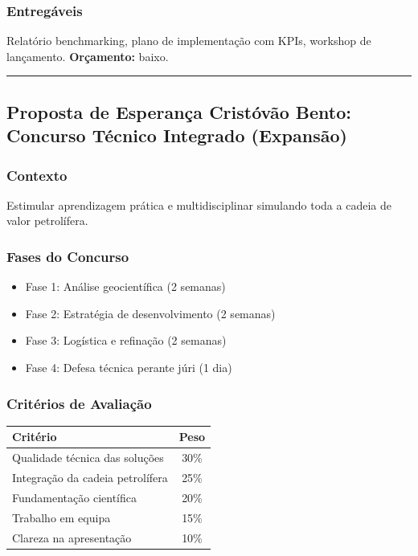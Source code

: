 \documentclass[12pt,a4paper]{article}
\newcommand{\proposalsep}{%
  \vspace{6pt}%
  {\color{gold}\rule{0.35\linewidth}{0.7pt}}%
  \vspace{4pt}%
}
\begin{document}
\subsubsection*{Entregáveis}
Relatório benchmarking, plano de implementação com KPIs, workshop de lançamento. \textbf{Orçamento:} baixo.

\proposalsep

\subsection{Proposta de Esperança Cristóvão Bento: Concurso Técnico Integrado (Expansão)}

\subsubsection*{Contexto}
Estimular aprendizagem prática e multidisciplinar simulando toda a cadeia de valor petrolífera.

\subsubsection*{Fases do Concurso}
\begin{itemize}
    \item Fase 1: Análise geocientífica (2 semanas)
    \item Fase 2: Estratégia de desenvolvimento (2 semanas)
    \item Fase 3: Logística e refinação (2 semanas)
    \item Fase 4: Defesa técnica perante júri (1 dia)
\end{itemize}

\subsubsection*{Critérios de Avaliação}

\begin{center}
\small
\begin{tabularx}{0.72\linewidth}{Xc}
\arrayrulecolor{icebd}\toprule
\rowcolor{navy}\color{white}\bfseries Critério & \color{white}\bfseries Peso \\
\midrule
Qualidade técnica das soluções & 30\% \\
\rowcolor{rowalt}Integração da cadeia petrolífera & 25\% \\
Fundamentação científica & 20\% \\
\rowcolor{rowalt}Trabalho em equipa & 15\% \\
Clareza na apresentação & 10\% \\
\bottomrule
\end{tabularx}
\end{center}
\end{document}
